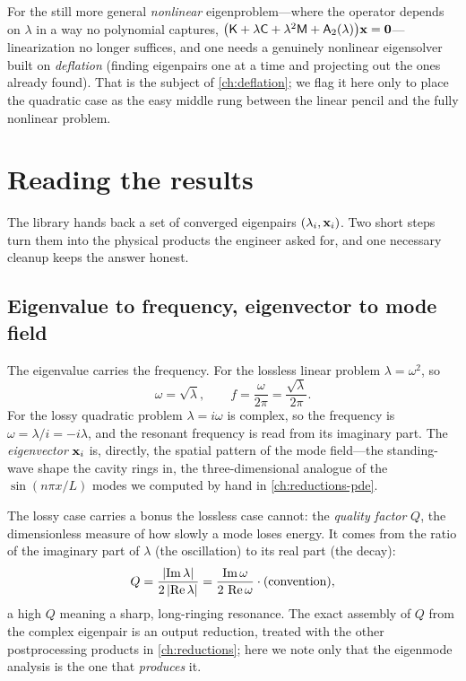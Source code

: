 For the still more general \emph{nonlinear} eigenproblem---where the operator
depends on $\lambda$ in a way no polynomial captures, $\bigl(\mathsf{K}+\lambda\mathsf{C}
+\lambda^2\mathsf{M}+\mathsf{A}_2(\lambda)\bigr)\mathbf{x}=\mathbf 0$---linearization no longer
suffices, and one needs a genuinely nonlinear eigensolver built on
\emph{deflation} (finding eigenpairs one at a time and projecting out the ones
already found). That is the subject of \cref{ch:deflation}; we flag it here only
to place the quadratic case as the easy middle rung between the linear pencil and
the fully nonlinear problem.

\section{Reading the results}
\label{sec:results}

The library hands back a set of converged eigenpairs $(\lambda_i,\mathbf{x}_i)$. Two
short steps turn them into the physical products the engineer asked for, and one
necessary cleanup keeps the answer honest.

\subsection{Eigenvalue to frequency, eigenvector to mode field}

The eigenvalue carries the frequency. For the lossless linear problem
$\lambda=\omega^2$, so
\begin{equation}
  \omega = \sqrt\lambda,\qquad
  f = \frac{\omega}{2\pi} = \frac{\sqrt\lambda}{2\pi}.
  \label{eq:freq}
\end{equation}
For the lossy quadratic problem $\lambda=i\omega$ is complex, so the frequency is
$\omega = \lambda/i = -i\lambda$, and the resonant frequency is read from its
imaginary part. The \emph{eigenvector} $\mathbf{x}_i$ is, directly, the spatial pattern
of the mode field---the standing-wave shape the cavity rings in, the
three-dimensional analogue of the $\sin(n\pi x/L)$ modes we computed by hand in
\cref{ch:reductions-pde}.

The lossy case carries a bonus the lossless case cannot: the \emph{quality
factor} $Q$, the dimensionless measure of how slowly a mode loses energy. It
comes from the ratio of the imaginary part of $\lambda$ (the oscillation) to its
real part (the decay):
\begin{equation}
  Q = \frac{\lvert\operatorname{Im}\lambda\rvert}{2\,\lvert\operatorname{Re}\lambda\rvert}
    = \frac{\operatorname{Im}\omega}{2\,\operatorname{Re}\omega}\cdot(\text{convention}),
\end{equation}
a high $Q$ meaning a sharp, long-ringing resonance. The exact assembly of $Q$
from the complex eigenpair is an output reduction, treated with the other
postprocessing products in \cref{ch:reductions}; here we note only that the
eigenmode analysis is the one that \emph{produces} it.

